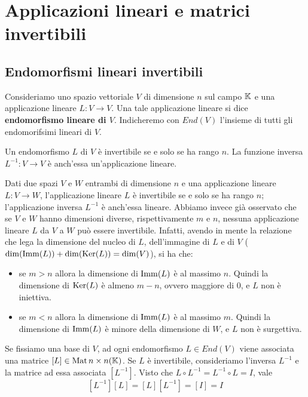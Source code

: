 \chapter{Applicazioni lineari e matrici invertibili}
\section{Endomorfismi lineari invertibili}

\begin{definition}
	Consideriamo uno spazio vettoriale $V$ di dimensione $n$ sul campo $\mathbb{K}$ e
	una applicazione lineare $L : V \to V$. Una tale applicazione lineare si dice
	\textbf{endomorfismo lineare di $V$}. Indicheremo con $End(V)$ l'insieme di tutti gli
	endomorifsimi lineari di $V$.
\end{definition}

\begin{proposition}
	Un endomorfismo $L$ di $V$ è invertibile se e solo se ha rango $n$. La
	funzione inversa $L^{-1} : V \to V$ è anch'essa un'applicazione lineare.
\end{proposition}

\begin{observation}
	Dati due spazi $V$ e $W$ entrambi di dimensione $n$ e una applicazione lineare
	$L : V \to W$, l'applicazione lineare $L$ è invertibile se e solo se ha rango
	$n$; l'applicazione inversa $L^{-1}$ è anch'essa lineare.
	Abbiamo invece già osservato che se $V$ e $W$ hanno dimensioni diverse,
	rispettivamente $m$ e $n$, nessuna applicazione lineare $L$ da $V$ a $W$ può
	essere invertibile. Infatti, avendo in mente la relazione che lega la dimensione
	del nucleo di $L$, dell'immagine di $L$ e di $V$
	($\dim(\operatorname{Imm}(L)) + \dim(\operatorname{Ker}(L)) = \dim(V)$), si ha che:
	\begin{itemize}
		\item se $m > n$ allora la dimensione di $\operatorname{Imm}(L)$ è al massimo $n$.
		      Quindi la dimensione di $\operatorname{Ker}(L)$ è almeno $m - n$, ovvero
		      maggiore di 0, e $L$ non è iniettiva.
		\item se $m < n$ allora la dimensione di $\operatorname{Imm}(L)$ è al massimo $m$.
		      Quindi la dimensione di $\operatorname{Imm}(L)$ è minore della dimensione di
		      $W$, e $L$ non è surgettiva.
	\end{itemize}
\end{observation}

Se fissiamo una base di $V$, ad ogni endomorfismo $L \in End(V)$ viene associata
una matrice $[L] \in \operatorname{Mat}{n \times n}(\mathbb{K})$. Se $L$ è invertibile,
consideriamo l'inversa $L^{-1}$ e la matrice ad essa associata $[L^{-1}]$.
Visto che $L \circ L^{-1} = L^{-1} \circ L = I$, vale
\[
	[L^{-1}][L] = [L][L^{-1}] = [I] = I
\]

